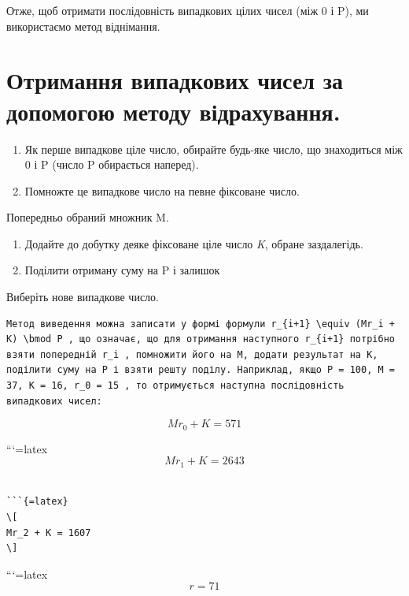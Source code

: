 \documentclass[
]{article}
\begin{document}
Отже, щоб отримати послідовність випадкових цілих чисел (між 0 і P), ми
використаємо метод віднімання.

\section{Отримання випадкових чисел за допомогою методу
відрахування.}\label{ux43eux442ux440ux438ux43cux430ux43dux43dux44f-ux432ux438ux43fux430ux434ux43aux43eux432ux438ux445-ux447ux438ux441ux435ux43b-ux437ux430-ux434ux43eux43fux43eux43cux43eux433ux43eux44e-ux43cux435ux442ux43eux434ux443-ux432ux456ux434ux440ux430ux445ux443ux432ux430ux43dux43dux44f.}

\begin{enumerate}
\def\labelenumi{\arabic{enumi}.}
\item
  Як перше випадкове ціле число, обирайте будь-яке число, що знаходиться
  між 0 і P (число P обирається наперед).
\item
  Помножте це випадкове число на певне фіксоване число.
\end{enumerate}

Попередньо обраний множник M.

\begin{enumerate}
\def\labelenumi{\arabic{enumi}.}
\setcounter{enumi}{2}
\item
  Додайте до добутку деяке фіксоване ціле число \emph{K}, обране
  заздалегідь.
\item
  Поділити отриману суму на P і залишок
\end{enumerate}

Виберіть нове випадкове число.

\begin{verbatim}
Метод виведення можна записати у формі формули r_{i+1} \equiv (Mr_i + K) \bmod P , що означає, що для отримання наступного r_{i+1} потрібно взяти попередній r_i , помножити його на M, додати результат на K, поділити суму на P і взяти решту поділу. Наприклад, якщо P = 100, M = 37, K = 16, r_0 = 15 , то отримується наступна послідовність випадкових чисел:
\end{verbatim}

\[
Mr_0 + K = 571
\]

```{=latex}
\[
Mr_1 + K = 2643
\]

\begin{verbatim}

```{=latex}
\[
Mr_2 + K = 1607
\]
\end{verbatim}

```{=latex}
\[
r = 71
\]
\end{document}
